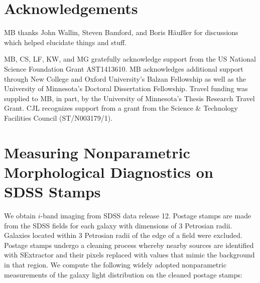 \documentclass[twocolumn]{aastex6}
\begin{document}
\section{Acknowledgements}
MB thanks John Wallin, Steven Bamford, and Boris H{\"a}u{\ss}ler for discussions which helped elucidate things and stuff. 

MB, CS, LF, KW, and MG gratefully acknowledge support from the US National Science
Foundation Grant AST1413610.  MB acknowledges additional support 
through New College and Oxford University's Balzan Fellowship as well as the University
of Minnesota's Doctoral Dissertation Fellowship. Travel funding was supplied 
to MB, in part, by the University of Minnesota's Thesis Research Travel Grant. CJL recognizes support from a grant from the Science \& Technology Facilities Council (ST/N003179/1). 





\appendix
\label{sec:Appendix}

\section{Measuring Nonparametric Morphological Diagnostics on SDSS Stamps}
\label{sec: measuring morphology}

We obtain $i$-band imaging from SDSS data release 12. Postage stamps are made from the SDSS fields for each galaxy with dimensions of 3 Petrosian radii. Galaxies located within 3 Petrosian radii of the edge of a field were excluded.  Postage stamps undergo a cleaning process whereby nearby sources are identified with SExtractor \citep[ver. 2.8.6;][]{sextractor} and their pixels replaced with values that mimic the background in that region. We compute the following widely adopted nonparametric measurements  of the galaxy light distribution on the cleaned postage stamps:
\end{document}
